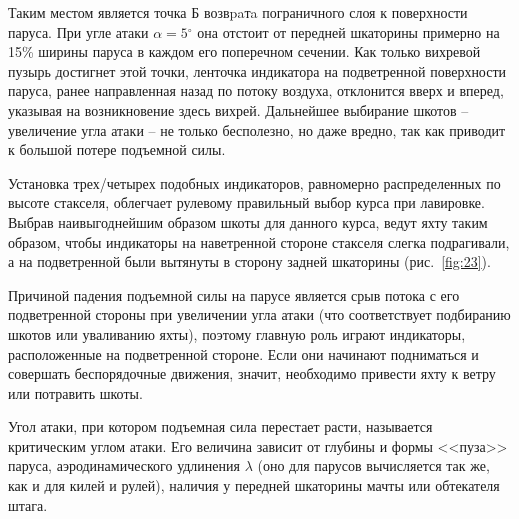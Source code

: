 \documentclass[a4paper, 12pt, twoside, final, book, russian, fittopage, cyremdash]{ncc}
\newcommand{\gr}{\ensuremath{^\circ}\xspace}
\newcommand{\ris}[1]{\ref{fig:#1}}
\begin{document}
Таким местом является точка Б возвpaтa пограничного слоя к поверхности паруса. При угле атаки $\alpha = 5\gr$ она отстоит от передней шкаторины примерно на 15\% ширины паруса в каждом его поперечном сечении. Как только вихревой пузырь достигнет этой точки, ленточка индикатора на подветренной поверхности паруса, ранее направленная назад по потоку воздуха, отклонится вверх и вперед, указывая на возникновение здесь вихрей. Дальнейшее выбирание шкотов \--- увеличение угла атаки \--- не только бесполезно, но даже вредно, так как приводит к большой потере подъемной силы.

Установка трех\-/четырех подобных индикаторов, равномерно распределенных по высоте стакселя, облегчает рулевому правильный выбор курса при лавировке. Выбрав наивыгоднейшим образом шкоты для данного курса, ведут яхту таким образом, чтобы индикаторы на наветренной стороне стакселя слегка подрагивали, а на подветренной были вытянуты в сторону задней шкаторины (рис.~\ris{23}).
 
Причиной падения подъемной силы на парусе является срыв потока с его подветренной стороны при увеличении угла атаки (что соответствует подбиранию шкотов или уваливанию яхты), поэтому главную роль играют индикаторы, расположенные на подветренной стороне. Если они начинают подниматься и совершать беспорядочные движения, значит, необходимо привести яхту к ветру или потравить шкоты.

Угол атаки, при котором подъемная сила перестает расти, называется критическим углом атаки. Его величина зависит от глубины и формы <<пуза>> паруса, аэродинамического удлинения $\lambda$ (оно для парусов вычисляется так же, как и для килей и рулей), наличия у передней шкаторины мачты или обтекателя штага.
\end{document}
